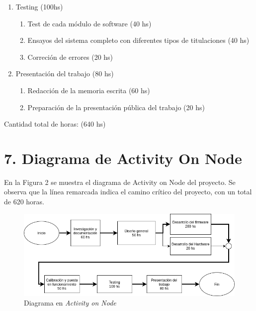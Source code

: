 \documentclass[11pt]{charter}
\begin{document}
\begin{enumerate}
\vspace{25px}
	
\item Testing (100hs)
	\begin{enumerate}	
	\item Test de cada módulo de software (40 hs)
	\item Ensayos del sistema completo con diferentes tipos de titulaciones (40 hs)
	\item Correción de errores (20 hs)
	\end{enumerate}
\item Presentación del trabajo (80 hs)
	\begin{enumerate}
	\item Redacción de la memoria escrita (60 hs)
	\item Preparación de la presentación pública del trabajo (20 hs)	
	\end{enumerate}
\end{enumerate}

Cantidad total de horas: (640 hs)

\section{7. Diagrama de Activity On Node}
\label{sec:AoN}
En la Figura 2 se muestra el diagrama de Activity on Node del proyecto. Se observa que la línea remarcada indica el camino crítico del proyecto, con un total de 620 horas.

\begin{figure}[htpb]
\centering 
\includegraphics[width=1\textwidth]{./Figuras/AoN.png}
\caption{Diagrama en \textit{Activity on Node}}
\label{fig:AoN}
\end{figure}
\end{document}
